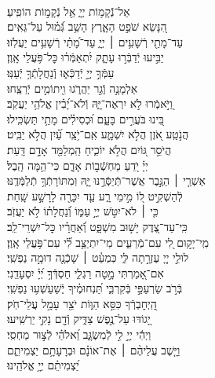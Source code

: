 \documentclass[twoside, openany, parskip=half, 11pt]{book}
\begin{document}
{\\
\vspace{-1.5\baselineskip}
\begin{narrow}
%
אֵל־נְֿֿקָמ֥וֹת יְיָ֑ \hfill אֵ֖ל נְֿקָמ֣וֹת הוֹפִֽיעַ׃ \\
הִ֭נָּשֵׂא שֹׁפֵ֣ט הָאָ֑רֶץ \hfill הָשֵׁ֥ב גְּֿ֝מ֗וּל עַל־גֵּאִֽים׃ \\
עַד־מָתַ֖י רְֿשָׁעִ֥ים ׀ יְיָ֑ \hfill עַד־מָ֝תַ֗י רְֿשָׁעִ֥ים יַעֲלֹֽזוּ׃ \\
יַבִּ֣יעוּ יְֿדַבְּֿר֣וּ עָתָ֑ק \hfill יִ֝תְאַמְּֿר֗וּ כׇּל־פֹּ֥עֲלֵי אָֽוֶן׃ \\
עַמְּֿךָ֣ יְיָ֣ יְֿדַכְּֿא֑וּ \hfill וְֽֿנַחֲלָתְֿךָ֥ יְֿעַנּֽוּ׃ \\
אַלְמָנָ֣ה וְֿגֵ֣ר יַהֲרֹ֑גוּ \hfill וִ֖יתוֹמִ֣ים יְֿרַצֵּֽחוּ׃ \\
וַ֭יֹּ֣אמְֿרוּ לֹ֣א יִרְאֶה־יָּ֑הּ \hfill וְֿלֹא־יָ֝בִ֗ין אֱלֹהֵ֥י יַעֲקֹֽב׃ \\
בִּ֭ינוּ בֹּעֲרִ֣ים בָּעָ֑ם \hfill וּ֝כְסִילִ֗ים מָתַ֥י תַּשְׂכִּֽילוּ׃ \\
הֲנֹ֣טַֽע אֹ֭זֶן הֲלֹ֣א יִשְׁמָ֑ע \hfill אִֽם־יֹ֥צֵֽר עַ֗֝יִן הֲלֹ֣א יַבִּֽיט׃ \\
הֲיֹסֵ֣ר גּ֭וֹיִם הֲלֹ֣א יוֹכִ֑יחַ \hfill הַֽמְלַמֵּ֖ד אָדָ֣ם דָּֽעַת׃ \\
יְיָ֗ יֹ֭דֵעַ מַחְשְֿׁב֣וֹת אָדָ֑ם \hfill כִּי־הֵ֥מָּה הָֽבֶל׃ \\
אַשְׁרֵ֤י ׀ הַגֶּ֣בֶר אֲשֶׁר־תְּֿיַסְּֿרֶ֣נּוּ יָּ֑הּ \hfill וּֽמִתּוֹרָתְֿךָ֥ תְֿלַמְּֿדֶֽנּוּ׃ \\
לְֿהַשְׁקִ֣יט ל֭וֹ מִ֣ימֵי רָ֑ע \hfill עַ֤ד יִכָּרֶ֖ה לָרָשָׁ֣ע שָֽׁחַת׃ \\
כִּ֤י ׀ לֹא־יִטֹּ֣שׁ יְיָ֣ עַמּ֑וֹ \hfill וְֿ֝נַחֲלָת֗וֹ לֹ֣א יַעֲזֹֽב׃ \\
כִּֽי־עַד־צֶ֭דֶק יָשׁ֣וּב מִשְׁפָּ֑ט \hfill וְֿ֝אַחֲרָ֗יו כׇּל־יִשְׁרֵי־לֵֽב׃ \\
מִֽי־יָק֣וּם לִ֭י עִם־מְֿרֵעִ֑ים \hfill מִי־יִתְיַצֵּ֥ב לִ֗֝י עִם־פֹּ֥עֲלֵי אָֽוֶן׃ \\
לוּלֵ֣י יְיָ֭ עֶזְרָ֣תָה לִּ֑י \hfill כִּמְעַ֓ט ׀ שָׁכְֿנָ֖ה דוּמָ֣ה נַפְשִֽׁי׃ \\
אִם־אָ֭מַרְתִּי מָ֣טָה רַגְלִ֑י \hfill חַסְדְּֿֿךָ֥ יְ֝יָ֗ יִסְעָדֵֽנִי׃ \\
בְּֿרֹ֣ב שַׂרְעַפַּ֣י בְּֿקִרְבִּ֑י \hfill תַּ֝נְחוּמֶ֗יךָ יְֽֿשַׁעַשְׁע֥וּ נַפְשִֽׁי׃ \\
הַֽ֭יְחׇבְרְֿךָ כִּסֵּ֣א הַוּ֑וֹת \hfill יֹצֵ֖ר עָמָ֣ל עֲלֵי־חֹֽק׃ \\
יָ֭גוֹדּוּ עַל־נֶ֣פֶשׁ צַדִּ֑יק \hfill וְֿדָ֖ם נָקִ֣י יַרְשִֽׁיעוּ׃ \\
וַיְהִ֬י יְיָ֣ לִ֣י לְֿמִשְׂגָּ֑ב \hfill וֵ֝אלֹהַ֗י לְֿצ֣וּר מַחְסִֽי׃ \\
וַיָּ֤שֶׁב עֲלֵיהֶ֨ם ׀ אֶת־אוֹנָ֗ם \hfill וּבְרָעָתָ֥ם יַצְמִיתֵ֑ם\\ יַ֝צְמִיתֵ֗ם יְיָ֥ אֱלֹהֵֽינוּ׃ \hfill \break


\end{narrow}}
\end{document}
